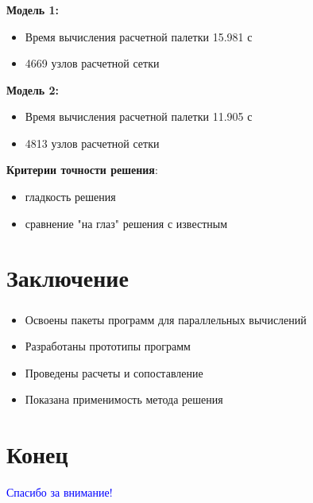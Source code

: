 \begin{frame}
\frametitle{\insertsection}

\textbf{Модель 1:}
\begin{itemize}
    \item Время вычисления расчетной палетки 15.981 с
    \item 4669 узлов расчетной сетки
\end{itemize}
\bigskip

\textbf{Модель 2:}
\begin{itemize}
    \item Время вычисления расчетной палетки 11.905 с
    \item 4813 узлов расчетной сетки
\end{itemize}
\bigskip

\textbf{Критерии точности решения}:
\begin{itemize}
    \item гладкость решения
    \item сравнение "на глаз" решения с известным
\end{itemize}
\end{frame}


\section{Заключение}

\begin{frame}
\frametitle{\insertsection}

\begin{itemize}
    \item Освоены пакеты программ для параллельных вычислений
    \item Разработаны прототипы программ
    \item Проведены расчеты и сопоставление
    \item Показана применимость метода решения
\end{itemize}
\end{frame}


\section{Конец}

\begin{frame}
\centering
\vfill
\textcolor{Blue}{\Large Спасибо за внимание!}
\vfill
\end{frame}